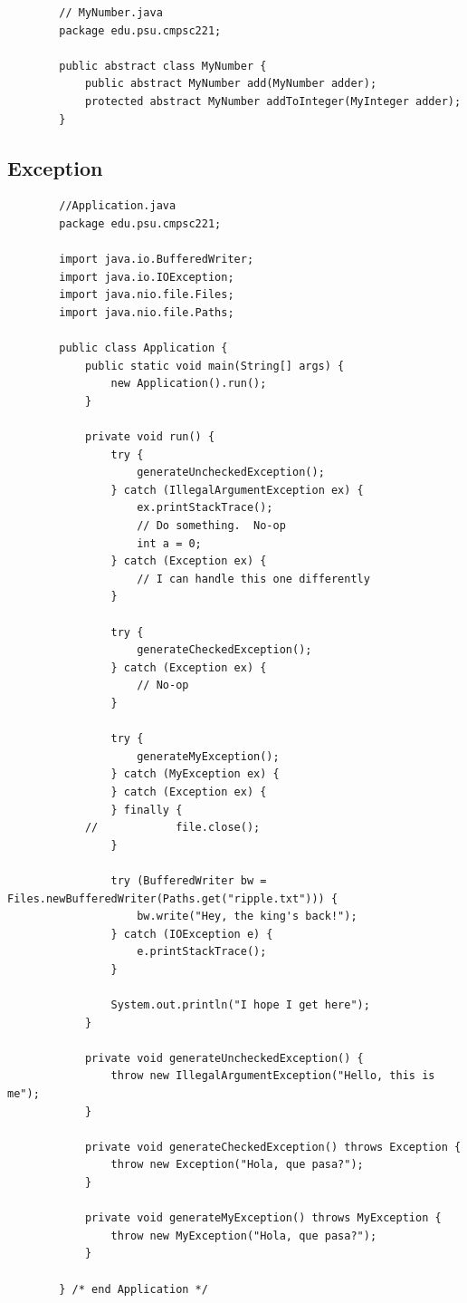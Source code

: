 \documentclass[a4paper, 11pt]{article}
\begin{document}
        \begin{lstlisting}
        // MyNumber.java
        package edu.psu.cmpsc221;

        public abstract class MyNumber {
            public abstract MyNumber add(MyNumber adder);
            protected abstract MyNumber addToInteger(MyInteger adder);
        }
        \end{lstlisting}

    \newpage

    \subsection{Exception}
        \begin{lstlisting}
        //Application.java
        package edu.psu.cmpsc221;

        import java.io.BufferedWriter;
        import java.io.IOException;
        import java.nio.file.Files;
        import java.nio.file.Paths;

        public class Application {
            public static void main(String[] args) {
                new Application().run();
            }

            private void run() {
                try {
                    generateUncheckedException();
                } catch (IllegalArgumentException ex) {
                    ex.printStackTrace();
                    // Do something.  No-op
                    int a = 0;
                } catch (Exception ex) {
                    // I can handle this one differently
                }

                try {
                    generateCheckedException();
                } catch (Exception ex) {
                    // No-op
                }

                try {
                    generateMyException();
                } catch (MyException ex) {
                } catch (Exception ex) {
                } finally {
            //            file.close();
                }

                try (BufferedWriter bw = Files.newBufferedWriter(Paths.get("ripple.txt"))) {
                    bw.write("Hey, the king's back!");
                } catch (IOException e) {
                    e.printStackTrace();
                }

                System.out.println("I hope I get here");
            }

            private void generateUncheckedException() {
                throw new IllegalArgumentException("Hello, this is me");
            }

            private void generateCheckedException() throws Exception {
                throw new Exception("Hola, que pasa?");
            }

            private void generateMyException() throws MyException {
                throw new MyException("Hola, que pasa?");
            }

        } /* end Application */
        \end{lstlisting}
\end{document}
